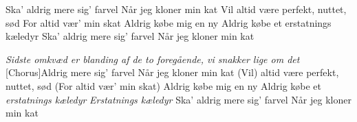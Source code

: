 \documentclass[a4paper,12pt]{article}
\begin{document}
\begin{song}
Ska' aldrig mere sig' farvel
Når jeg kloner min kat
Vil altid være perfekt, nuttet, sød
For altid vær' min skat
Aldrig købe mig en ny
Aldrig købe et erstatnings kæledyr
Ska' aldrig mere sig' farvel
Når jeg kloner min kat

\emph{Sidste omkvæd er blanding af de to foregående, vi snakker lige om det}
[Chorus]Aldrig mere sig' farvel
Når jeg kloner min kat
(Vil) altid være perfekt, nuttet, sød
(For altid vær' min skat)
Aldrig købe mig en ny
Aldrig købe et \emph{erstatnings kæledyr}
\emph{Erstatnings kæledyr}
Ska' aldrig mere sig' farvel
Når jeg kloner min kat

\end{song}
\end{document}
